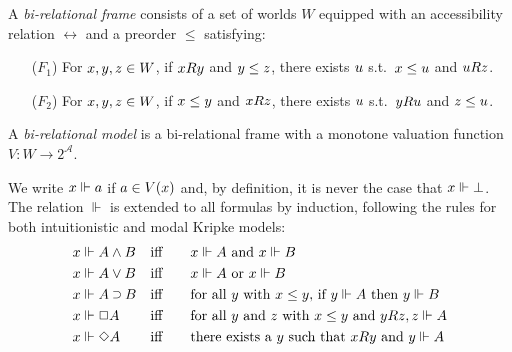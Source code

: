 \documentclass[twoside]{aiml20}
\begin{document}
\begin{definition}
	A \emph{bi-relational frame} consists %
	of a set of worlds $W$ equipped with an {accessibility relation} $\rel$ and a preorder $\le$ satisfying:
	\begin{enumerate}
		\item[($F_1$)] For $x, y, z \in W$, if $xRy$ and $y\le{z}$, there exists $u$ s.t.~$x\le{u}$ and $uRz$.
		
		\item[($F_2$)] For $x, y, z \in W$, if $x\le{y}$ and $xRz$, there exists $u$ s.t.~$yRu$ and $z\le{u}$.
	\end{enumerate}
\end{definition}

\begin{definition}
	A \emph{bi-relational model} is %
	a bi-relational frame with a monotone valuation function $V\colon W \to 2^\mathcal{A}$.%
\end{definition}

We write $x \Vdash a$ if $a \in V(x)$ and, by definition, it is never the case that $x \Vdash \mathord{\bot}$. %
%
The relation $\Vdash$ is extended to all formulas by induction, following the rules for both intuitionistic and modal Kripke models:\vspace*{-.1cm}
\begin{align}
	&\lb x \Vdash \fm{A \AND B} && \text{iff}\qquad 
	\lb x \Vdash \fm A \text{ and } \lb x \Vdash \fm B
	\nonumber\\
	&\lb x \Vdash \fm{A \OR B} && \text{iff}\qquad 
	\lb x \Vdash \fm A \text{ or } \lb x \Vdash \fm B
	\nonumber\\
	&\lb x \Vdash \fm{A \IMP B} && \text{iff}\qquad 
	\text{for all } \lb y \text{ with } \futs xy\text{, if }\lb y \Vdash \fm A\text{ then }\lb y \Vdash \fm B
	\nonumber\\
	&\lb x \Vdash \fm{\BOX A} && \text{iff}\qquad
	\text{for all }\lb y\text{ and }\lb z\text{ with }\futs xy\text{ and }\accs yz, \lb z \Vdash \fm A %
	\label{eq:box}\\
	&\lb x \Vdash \fm{\DIA A} && \text{iff}\qquad
	\text{there exists a }\lb y\text{ such that }\accs xy\text{ and }\lb y \Vdash \fm A
	\nonumber
\end{align}
\end{document}
